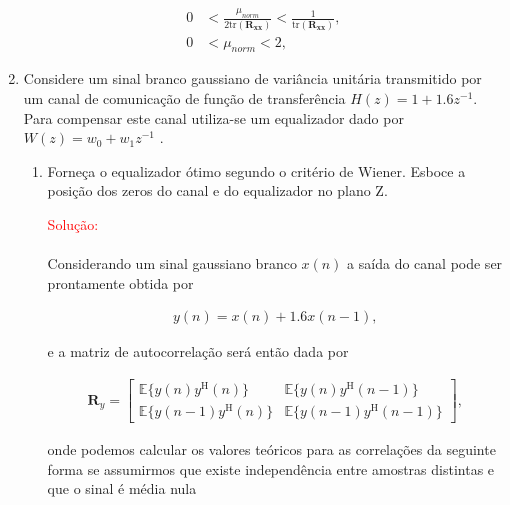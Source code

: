 \documentclass[a4paper,10pt]{article}
\begin{document}
\begin{enumerate}
			\begin{align}
				0 &< \frac{\mu_{norm}}{2 \text{tr}(\mathbf{R_{xx}})} < \frac{1}{\text{tr}(\mathbf{R_{xx}})}, \\
				0 &< \mu_{norm} < 2, 
			\end{align}
						
			\item Considere um sinal branco gaussiano de variância unitária transmitido por um canal de comunicação de função de transferência $H(z) = 1 + 1.6z^{-1}$. Para compensar este
			canal utiliza-se um equalizador dado por $W(z) = w_{0} + w_{1}z^{-1}$ .
			
			
				\begin{enumerate}
					
					\item Forneça o equalizador ótimo segundo o critério de Wiener. Esboce a posição dos zeros do canal e do equalizador no plano Z.
					
						\textcolor{red}{Solução:}
						
						\paragraph{}Considerando um sinal gaussiano branco $x(n)$ a saída do canal pode ser prontamente obtida por
						
						\begin{align}
							y(n) = x(n) + 1.6 x(n - 1),
						\end{align}
						
						e a matriz de autocorrelação será então dada por
						
						\begin{align}
							\mathbf{R}_{y} =
							\begin{bmatrix}
								\mathbb{E}\{y(n)y^{\text{H}}(n)\} & \mathbb{E}\{y(n)y^{\text{H}}(n - 1)\} \\
								\mathbb{E}\{y(n - 1)y^{\text{H}}(n)\} & \mathbb{E}\{y(n - 1)y^{\text{H}}(n - 1)\}
							\end{bmatrix},
						\end{align}
						
						onde podemos calcular os valores teóricos para as correlações da seguinte forma se assumirmos que existe independência entre amostras distintas e que o sinal é média nula 
						

\end{enumerate}
\end{enumerate}
\end{document}
